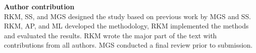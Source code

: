 \documentclass[gmd, manuscript]{copernicus}
\begin{document}









\vspace{0.5cm}

\textbf{Author contribution}\\ RKM, SS, and MGS designed the study based on previous work by MGS and SS. RKM, AP, and ML developed the methodology, RKM implemented the methods and evaluated the results. RKM wrote the major part of the text with contributions from all authors. MGS conducted a final review prior to submission.\vspace{0.5cm}\\%
\end{document}
